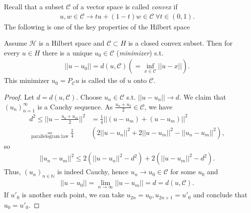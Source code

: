 Recall that a subset \(\mathcal{C}\) of a vector space is called \emph{convex} if 
\begin{align*}
    u,w\in\mathcal{C} \rightarrow tu + (1-t)w\in\mathcal{C} \ \forall t\in(0,1).
\end{align*}
The following is one of the key properties of the Hilbert space
\begin{theorem}
    Assume \(\mathcal{H}\) is a Hilbert space and \(\mathcal{C}\subset H\) is a closed convex subset. Then for every \(u\in H\) there is a unique 
    \(u_0\in\mathcal{C}\) (\emph{minimizer}) s.t.
    \begin{align*}
        ||u-u_0|| = d(u,\mathcal{C})(=\inf\limits_{x\in\mathcal{C}} ||u-x||).
    \end{align*}
    This minimizer \(u_0 = P_{\mathcal{C}}u\) is called the of \(u\) onto \(\mathcal{C}\).
\end{theorem}
\ifdetailed 
\begin{proof}
    Let \(d=d(u,\mathcal{C})\). Choose \(u_n\in\mathcal{C}\) s.t. \(||u-u_n||\rightarrow d\). We claim that \((u_n)^{\infty}_{n=1}\) is a 
    Cauchy sequence. As \(\frac{u_n+u_2}{2}\in\mathcal{C}\), we have 
    \begin{align*}
        d^2\leq ||u-\frac{u_n+u_m}{2}||^2 &= \frac{1}{4}||(u-u_m)+(u-u_m)||^2 \\
        \underset{\text{parallelogram law}}{=} \frac{1}{4}&\left(2||u-u_n||^2 + 2||u-u_m||^2 - ||u_n-u_m||^2\right),
    \end{align*}
    so 
    \begin{align*}
        ||u_n-u_m||^2 \leq 2\left( ||u-u_n||^2 - d^2 \right) + 2\left( ||u-u_m||^2 - d^2 \right).
    \end{align*}
    Thus, \((u_n)_{n\in\mathbb{N}}\) is indeed Cauchy, hence \(u_n\rightarrow u_0\in\mathcal{C}\) for some \(u_0\) and
    \begin{align*}
        ||u-u_0|| = \lim\limits_{n\rightarrow\infty} ||u-u_m|| = d = d(u,\mathcal{C}).
    \end{align*}
    If \(u'_0\) is another such point, we can take \(u_{2n}=u_0, u_{2n+1}=u'_0\) and conclude that \(u_0 = u'_0\).
\end{proof}
\fi 
